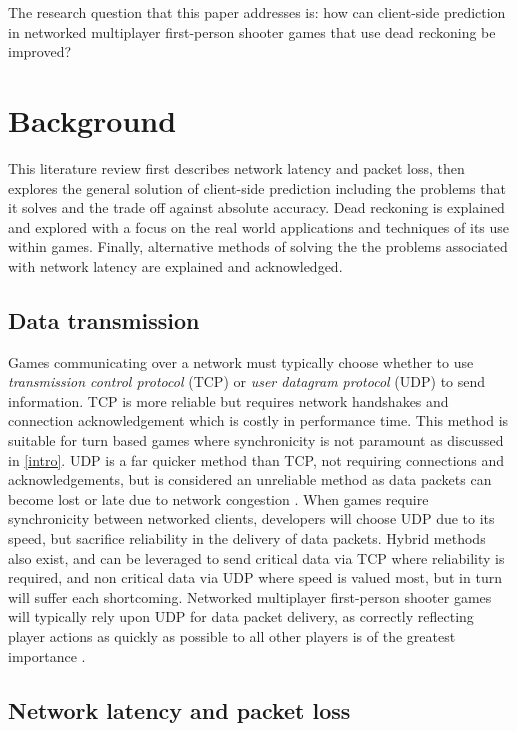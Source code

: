 \documentclass[journal]{IEEEtran}
\begin{document}
The research question that this paper addresses is: how can client-side prediction in networked multiplayer first-person shooter games that use dead reckoning be improved?

\section{Background} \label{background}

This literature review first describes network latency and packet loss, then explores the general solution of client-side prediction including the problems that it solves and the trade off against absolute accuracy. Dead reckoning is explained and explored with a focus on the real world applications and techniques of its use within games. Finally, alternative methods of solving the the problems associated with network latency are explained and acknowledged.

\subsection{Data transmission}

Games communicating over a network must typically choose whether to use \textit{transmission control protocol} (TCP) or \textit{user datagram protocol} (UDP) to send information. TCP is more reliable but requires network handshakes and connection acknowledgement which is costly in performance time. This method is suitable for turn based games where synchronicity is not paramount \cite{fiedler2002communication} as discussed in \ref{intro}. UDP is a far quicker method than TCP, not requiring connections and acknowledgements, but is considered an unreliable method as data packets can become lost or late due to network congestion \cite{chen2006empirical}. When games require synchronicity between networked clients, developers will choose UDP due to its speed, but sacrifice reliability in the delivery of data packets. Hybrid methods also exist, and can be leveraged to send critical data via TCP where reliability is required, and non critical data via UDP where speed is valued most, but in turn will suffer each shortcoming. Networked multiplayer first-person shooter games will typically rely upon UDP for data packet delivery, as correctly reflecting player actions as quickly as possible to all other players is of the greatest importance \cite{bharambe2008donnybrook}.

\subsection{Network latency and packet loss} \label{networklatency}
\end{document}
